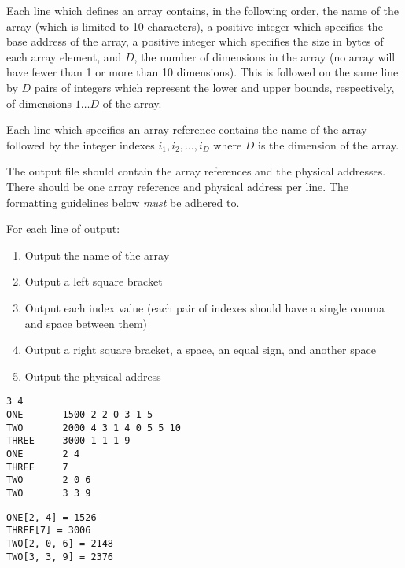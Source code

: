 Each line which defines an array contains, in the following order, the
name of the array (which is limited to 10 characters), a positive
integer which specifies the base address of the array, a positive
integer which specifies the size in bytes of each array element, and
$D$, the number of dimensions in the array (no array will have fewer
than 1 or more than 10 dimensions).  This is followed on the same line
by $D$ pairs of integers which represent the lower and upper bounds,
respectively, of dimensions $1\ldots D$ of the array.

Each line which specifies an array reference contains the name of the
array followed by the integer indexes $i_1,i_2,\ldots,i_D$ where $D$
is the dimension of the array.

The output file should contain the array references and the physical
addresses.  There should be one array reference and physical address
per line.  The formatting guidelines below {\em must\/} be adhered to.

For each line of output:

\begin{enumerate}
\item Output the name of the array
\item Output a left square bracket
\item Output each index value (each pair of indexes should have a
single comma and space between them)
\item Output a right square bracket, a space, an equal sign, and
another space
\item Output the physical address
\end{enumerate}

\bigskip
{}

{\small
\begin{verbatim}
3 4
ONE       1500 2 2 0 3 1 5
TWO       2000 4 3 1 4 0 5 5 10
THREE     3000 1 1 1 9
ONE       2 4
THREE     7
TWO       2 0 6
TWO       3 3 9
\end{verbatim}
}

\bigskip
{}

{\small
\begin{verbatim}
ONE[2, 4] = 1526
THREE[7] = 3006
TWO[2, 0, 6] = 2148
TWO[3, 3, 9] = 2376
\end{verbatim}
}



